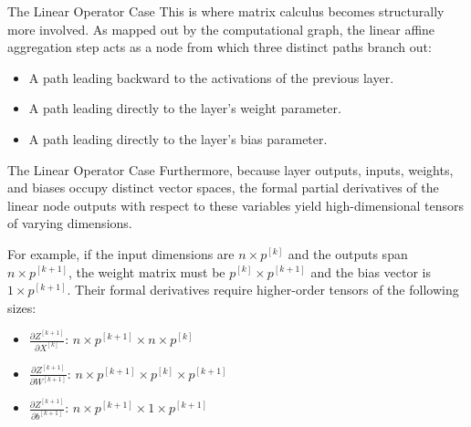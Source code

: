 \begin{frame}{The Linear Operator Case}
	This is where matrix calculus becomes structurally more involved. As mapped out by the computational graph, the linear affine aggregation step acts as a node from which three distinct paths branch out:
	
	\begin{itemize}
		\item A path leading backward to the activations of the previous layer.
		\item A path leading directly to the layer's weight parameter.
		\item A path leading directly to the layer's bias parameter.
	\end{itemize}
\end{frame}

\begin{frame}{The Linear Operator Case}
	Furthermore, because layer outputs, inputs, weights, and biases occupy distinct vector spaces, the formal partial derivatives of the linear node outputs with respect to these variables yield high-dimensional tensors of varying dimensions.
	
	\vspace{0.3cm}
	\pause
	
	For example, if the input dimensions are $n \times p^{[k]}$ and the outputs span $n \times p^{[k+1]}$, the weight matrix must be $p^{[k]} \times p^{[k+1]}$ and the bias vector is $1 \times p^{[k+1]}$. Their formal derivatives require higher-order tensors of the following sizes:
	
	\begin{itemize}
		\item $\frac{\partial{Z^{[k+1]}}}{\partial{X^{[k]}}}$: $n \times p^{[k+1]} \times n \times p^{[k]}$
		\item $\frac{\partial{Z^{[k+1]}}}{\partial{W^{[k+1]}}}$: $n \times p^{[k+1]} \times p^{[k]} \times p^{[k+1]}$
		\item $\frac{\partial{Z^{[k+1]}}}{\partial{b^{[k+1]}}}$: $n \times p^{[k+1]} \times 1 \times p^{[k+1]}$
	\end{itemize}
\end{frame}

